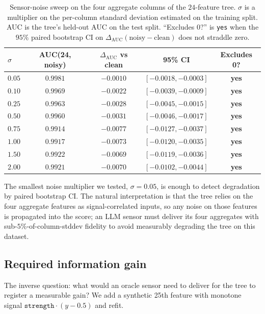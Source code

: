 \begin{table}[t]
\centering
\small
\caption{Sensor-noise sweep on the four aggregate columns of the
$24$-feature tree. $\sigma$ is a multiplier on the per-column
standard deviation estimated on the training split. AUC is the tree's
held-out AUC on the test split. ``Excludes 0?'' is \texttt{yes} when the
$95\%$ paired bootstrap CI on $\Delta_{\text{AUC}}(\text{noisy} -
\text{clean})$ does not straddle zero. }
\label{tab:p8-noise-sweep}
\begin{tabular}{lcccc}
\toprule
$\sigma$ & AUC(24, noisy) & $\Delta_{\text{AUC}}$ vs clean & 95\% CI & Excludes 0? \\
\midrule
$0.05$ & $0.9981$ & $-0.0010$ & $[-0.0018, -0.0003]$ & \textbf{yes} \\
$0.10$ & $0.9969$ & $-0.0022$ & $[-0.0039, -0.0009]$ & \textbf{yes} \\
$0.25$ & $0.9963$ & $-0.0028$ & $[-0.0045, -0.0015]$ & \textbf{yes} \\
$0.50$ & $0.9960$ & $-0.0031$ & $[-0.0046, -0.0017]$ & \textbf{yes} \\
$0.75$ & $0.9914$ & $-0.0077$ & $[-0.0127, -0.0037]$ & \textbf{yes} \\
$1.00$ & $0.9917$ & $-0.0073$ & $[-0.0120, -0.0035]$ & \textbf{yes} \\
$1.50$ & $0.9922$ & $-0.0069$ & $[-0.0119, -0.0036]$ & \textbf{yes} \\
$2.00$ & $0.9921$ & $-0.0070$ & $[-0.0102, -0.0044]$ & \textbf{yes} \\
\bottomrule
\end{tabular}
\end{table}

The smallest noise multiplier we tested, $\sigma = 0.05$, is enough to
detect degradation by paired bootstrap CI. The natural interpretation is
that the tree relies on the four aggregate features as signal-correlated
inputs, so any noise on those features is propagated into the score; an
LLM sensor must deliver its four aggregates with sub-$5\%$-of-column-stddev
fidelity to avoid measurably degrading the tree on this dataset.

\subsection{Required information gain}

The inverse question: what would an oracle sensor need to deliver for
the tree to register a measurable gain? We add a synthetic 25th feature
with monotone signal $\texttt{strength} \cdot (y - 0.5)$ and refit.

